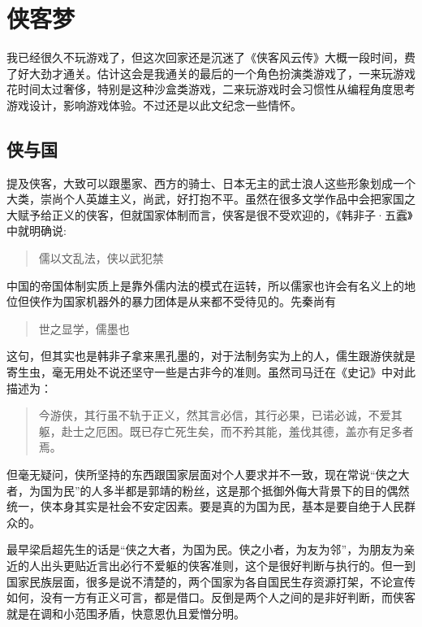 \documentclass[
  letterpaper,
  DIV=11,
  numbers=noendperiod]{scrreprt}
\begin{document}
\section{侠客梦}\label{ux4fa0ux5ba2ux68a6}

我已经很久不玩游戏了，但这次回家还是沉迷了《侠客风云传》大概一段时间，费了好大劲才通关。估计这会是我通关的最后的一个角色扮演类游戏了，一来玩游戏花时间太过奢侈，特别是这种沙盒类游戏，二来玩游戏时会习惯性从编程角度思考游戏设计，影响游戏体验。不过还是以此文纪念一些情怀。

\subsection{侠与国}\label{ux4fa0ux4e0eux56fd}

提及侠客，大致可以跟墨家、西方的骑士、日本无主的武士浪人这些形象划成一个大类，崇尚个人英雄主义，尚武，好打抱不平。虽然在很多文学作品中会把家国之大赋予给正义的侠客，但就国家体制而言，侠客是很不受欢迎的，《韩非子·五蠧》中就明确说:

\begin{quote}
儒以文乱法，侠以武犯禁
\end{quote}

中国的帝国体制实质上是靠外儒内法的模式在运转，所以儒家也许会有名义上的地位但侠作为国家机器外的暴力团体是从来都不受待见的。先秦尚有

\begin{quote}
世之显学，儒墨也
\end{quote}

这句，但其实也是韩非子拿来黑孔墨的，对于法制务实为上的人，儒生跟游侠就是寄生虫，毫无用处不说还坚守一些是古非今的准则。虽然司马迁在《史记》中对此描述为：

\begin{quote}
今游侠，其行虽不轨于正义，然其言必信，其行必果，已诺必诚，不爱其躯，赴士之厄困。既已存亡死生矣，而不矜其能，羞伐其德，盖亦有足多者焉。
\end{quote}

但毫无疑问，侠所坚持的东西跟国家层面对个人要求并不一致，现在常说``侠之大者，为国为民''的人多半都是郭靖的粉丝，这是那个抵御外侮大背景下的目的偶然统一，侠本身其实是社会不安定因素。要是真的为国为民，基本是要自绝于人民群众的。

最早梁启超先生的话是``侠之大者，为国为民。侠之小者，为友为邻''，为朋友为亲近的人出头更贴近言出必行不爱躯的侠客准则，这个是很好判断与执行的。但一到国家民族层面，很多是说不清楚的，两个国家为各自国民生存资源打架，不论宣传如何，没有一方有正义可言，都是借口。反倒是两个人之间的是非好判断，而侠客就是在调和小范围矛盾，快意恩仇且爱憎分明。
\end{document}

